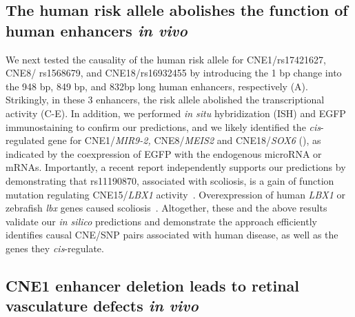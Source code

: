 \subsection{The human risk allele abolishes the function of human enhancers \emph{in vivo}}

We next tested the causality of the human risk allele for
CNE1/rs17421627, CNE8/ rs1568679, and CNE18/rs16932455 by introducing the
1 bp change into the 948 bp, 849 bp, and 832bp long human enhancers,
respectively (A). Strikingly, in these 3 enhancers, the risk
allele abolished the transcriptional activity (C-E). In addition,
we performed \emph{in situ} hybridization (ISH) and EGFP immunostaining
to confirm our predictions, and we likely identified the
\emph{cis}-regulated gene for CNE1/\emph{MIR9-2,} CNE8/\emph{MEIS2} and
CNE18/\emph{SOX6} (), as indicated by the coexpression of EGFP
with the endogenous microRNA or mRNAs. Importantly, a recent report
independently supports our predictions by demonstrating that rs11190870,
associated with scoliosis, is a gain of function mutation regulating
CNE15/\emph{LBX1} activity~\citep{Guo:2016ho}. Overexpression of human \emph{LBX1} or zebrafish \emph{lbx}
genes caused scoliosis~\citep{Guo:2016ho}.
Altogether, these and the above results validate our \emph{in silico}
predictions and demonstrate the approach efficiently identifies causal
CNE/SNP pairs associated with human disease, as well as the genes they
\emph{cis}-regulate.

\subsection{CNE1 enhancer deletion leads to retinal vasculature defects \emph{in vivo}}

